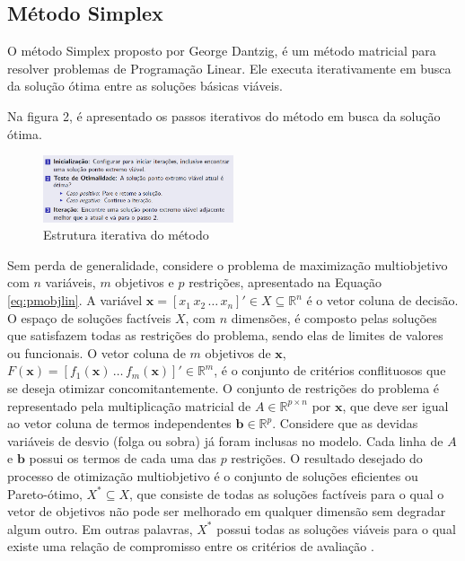 \documentclass [11pt]{articleSBPO}
\begin{document}
\subsection{Método Simplex}

O método Simplex proposto por George Dantzig, é um método matricial para resolver problemas de Programação Linear. Ele executa iterativamente em busca da solução ótima entre as soluções básicas viáveis. 

Na figura 2, é apresentado os passos iterativos do método em busca da solução ótima.

\begin{figure}[!h]
\centering
\includegraphics[width=0.5\textwidth]{img/img1.png}
\caption[]{Estrutura iterativa do método}
\label{fig:figura2}
\end{figure}


Sem perda de generalidade, considere o problema de maximização multiobjetivo com $n$ variáveis, $m$ objetivos e $p$ restrições, apresentado na Equação \ref{eq:pmobjlin}. A variável $\mathbf{x} = \left[ x_1 \, x_2 \, \ldots \, x_n \right]' \in X \subseteq \mathbb{R}^n$ é o vetor  coluna de decisão. O espaço de soluções factíveis $X$, com $n$ dimensões, é composto pelas soluções que satisfazem todas as restrições do problema, sendo elas de limites de valores ou funcionais. O vetor coluna de $m$ objetivos de $\mathbf{x}$, $F(\mathbf{x}) = \left[ f_1(\mathbf{x}) \, \ldots \, f_m(\mathbf{x}) \right]' \in \mathbb{R}^m$, é o conjunto de critérios conflituosos que se deseja otimizar concomitantemente. O conjunto de restrições do problema é representado pela multiplicação matricial de $A \in \mathbb{R}^{p \times n}$ por $\mathbf{x}$, que deve ser igual ao vetor coluna de termos independentes $\mathbf{b} \in \mathbb{R}^p$. Considere que as devidas variáveis de desvio (folga ou sobra) já foram inclusas no modelo. Cada linha de $A$ e $\mathbf{b}$ possui os termos de cada uma das $p$ restrições. O resultado desejado do processo de otimização multiobjetivo é o conjunto de soluções eficientes ou Pareto-ótimo, $X^{*} \subseteq X$, que consiste de todas as soluções factíveis para o qual o vetor de objetivos não pode ser melhorado em qualquer dimensão sem degradar algum outro. Em outras palavras, $X^{*}$ possui todas as soluções viáveis para o qual existe uma relação de compromisso entre os critérios de avaliação \cite{steuer1986multiple,takahashi2007otimizacao}.
\end{document}
